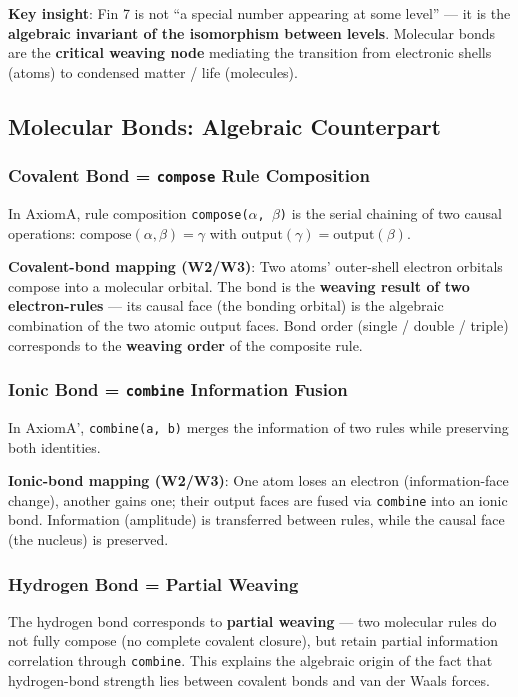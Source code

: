 \documentclass[aps,prd,twocolumn,nofootinbib,floatfix]{revtex4-2}
\begin{document}
\textbf{Key insight}: Fin 7 is not ``a special number appearing at some level'' --- it is the \textbf{algebraic invariant of the isomorphism between levels}. Molecular bonds are the \textbf{critical weaving node} mediating the transition from electronic shells (atoms) to condensed matter / life (molecules).

\subsection{Molecular Bonds: Algebraic Counterpart}

\subsubsection{Covalent Bond = \texttt{compose} Rule Composition}

In AxiomA, rule composition \texttt{compose($\alpha$, $\beta$)} is the serial chaining of two causal operations: $\text{compose}(\alpha, \beta) = \gamma$ with $\text{output}(\gamma) = \text{output}(\beta)$.

\textbf{Covalent-bond mapping (W2/W3)}: Two atoms' outer-shell electron orbitals compose into a molecular orbital. The bond is the \textbf{weaving result of two electron-rules} --- its causal face (the bonding orbital) is the algebraic combination of the two atomic output faces. Bond order (single / double / triple) corresponds to the \textbf{weaving order} of the composite rule.

\subsubsection{Ionic Bond = \texttt{combine} Information Fusion}

In AxiomA', \texttt{combine(a, b)} merges the information of two rules while preserving both identities.

\textbf{Ionic-bond mapping (W2/W3)}: One atom loses an electron (information-face change), another gains one; their output faces are fused via \texttt{combine} into an ionic bond. Information (amplitude) is transferred between rules, while the causal face (the nucleus) is preserved.

\subsubsection{Hydrogen Bond = Partial Weaving}

The hydrogen bond corresponds to \textbf{partial weaving} --- two molecular rules do not fully compose (no complete covalent closure), but retain partial information correlation through \texttt{combine}. This explains the algebraic origin of the fact that hydrogen-bond strength lies between covalent bonds and van der Waals forces.
\end{document}

